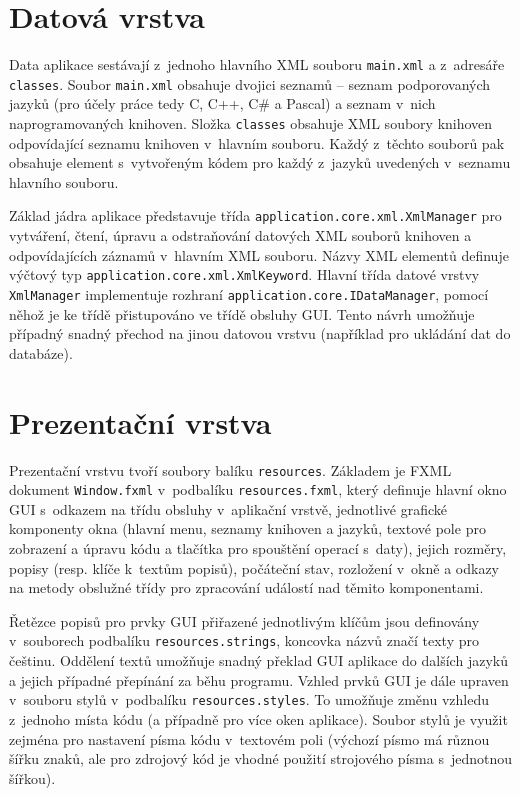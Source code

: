 \documentclass[czech,BP]{thesiskiv}
\begin{document}
\section{Datová vrstva}

Data aplikace sestávají z~jednoho hlavního XML souboru \texttt{main.xml} a z~adresáře \texttt{classes}. Soubor \texttt{main.xml} obsahuje dvojici seznamů -- seznam podporovaných jazyků (pro účely práce tedy C, C++, C\# a Pascal) a seznam v~nich naprogramovaných knihoven. Složka \texttt{classes} obsahuje XML soubory knihoven odpovídající seznamu knihoven v~hlavním souboru. Každý z~těchto souborů pak obsahuje element s~vytvořeným kódem pro každý z~jazyků uvedených v~seznamu hlavního souboru.\par
Základ jádra aplikace představuje třída \texttt{application.core.xml.Xml\-Manager} pro vytváření, čtení, úpravu a odstraňování datových XML souborů knihoven a odpovídajících záznamů v~hlavním XML souboru. Názvy XML elementů definuje výčtový typ \texttt{application.core.xml.XmlKeyword}. Hlavní třída datové vrstvy \texttt{XmlManager} implementuje rozhraní \texttt{application.core\-.IDataManager}, pomocí něhož je ke třídě přistupováno ve třídě obsluhy GUI. Tento návrh umožňuje případný snadný přechod na jinou datovou vrstvu (například pro ukládání dat do databáze).

\section{Prezentační vrstva}

Prezentační vrstvu tvoří soubory balíku \texttt{resources}. Základem je FXML dokument \texttt{Window.fxml} v~podbalíku \texttt{resources.fxml}, který definuje hlavní okno GUI s~odkazem na třídu obsluhy v~aplikační vrstvě, jednotlivé grafické komponenty okna (hlavní menu, seznamy knihoven a jazyků, textové pole pro zobrazení a úpravu kódu a tlačítka pro spouštění operací s~daty), jejich rozměry, popisy (resp. klíče k~textům popisů), počáteční stav, rozložení v~okně a odkazy na metody obslužné třídy pro zpracování událostí nad těmito komponentami.\par
Řetězce popisů pro prvky GUI přiřazené jednotlivým klíčům jsou definovány v~souborech podbalíku \texttt{resources.strings}, koncovka názvů  značí texty pro češtinu. Oddělení textů umožňuje snadný překlad GUI aplikace do dalších jazyků a jejich případné přepínání za běhu programu. Vzhled prvků GUI je dále upraven v~souboru stylů v~podbalíku \texttt{resources.styles}. To umožňuje změnu vzhledu z~jednoho místa kódu (a případně pro více oken aplikace). Soubor stylů je využit zejména pro nastavení písma kódu v~textovém poli (výchozí písmo má různou šířku znaků, ale pro zdrojový kód je vhodné použití strojového písma s~jednotnou šířkou).
\end{document}
